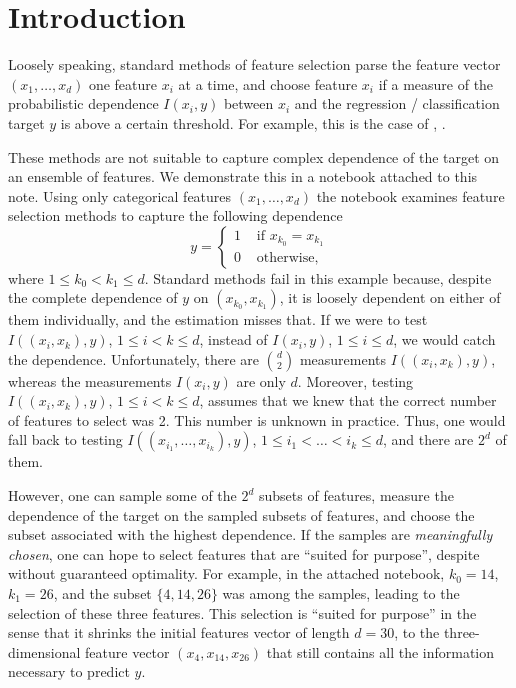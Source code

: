 \section{Introduction}

Loosely speaking,
standard methods of feature selection
parse the feature vector
$(x_1, \dots, x_d)$
one feature $x_i$ at a time,
and 
choose feature $x_i$ if
a measure of the probabilistic dependence 
$I(x_i, y)$ between $x_i$ and the regression / classification target $y$
is above a certain threshold. 
For example, 
this is the case of
,
.

These methods are not suitable to capture 
complex dependence of the target on 
an ensemble of features. 
We demonstrate this in a notebook attached to this note. 
Using only categorical features 
$(x_1, \dots, x_d)$
the notebook examines feature selection methods to capture the following dependence
$$
y = \begin{cases}
	1 & \text{ if } x_{k_0} = x_{k_1}
	\\
	0 & \text{ otherwise,}
\end{cases}
$$
where $1\leq k_0 < k_1 \leq d$.
Standard methods fail in this example because,
despite the complete dependence of $y$ on $(x_{k_0}, x_{k_1})$,
it is loosely dependent on either of them individually, 
and the estimation misses that.
If we were to test 
$I((x_{i}, x_{k}), y)$,  
$1\leq i < k \leq d$,
instead of 
$I(x_i, y)$,
$1\leq i \leq d$,
we would catch the dependence. 
Unfortunately,
there are ${d \choose 2}$ measurements $I((x_{i}, x_{k}), y)$,
whereas the measurements $I(x_i, y)$ are only $d$. 
Moreover, 
testing
$I((x_{i}, x_{k}), y)$,  
$1\leq i < k \leq d$,
assumes that we knew that the correct number of features to select was 2. 
This number is unknown in practice. 
Thus, one would fall back to testing
$I((x_{i_1}, \dots,  x_{i_{k}}), y)$,  
$1\leq i_1 <\dots < i_k \leq d$,
and there are $2^d$ of them.

However,
one can sample some of the $2^d$ subsets of features,
measure the dependence of the target on the sampled subsets of features,
and choose the subset associated with the highest dependence. 
If the samples are \emph{meaningfully chosen},
one can hope to select features that are 
``suited for purpose'',
despite without guaranteed optimality.
For example, in the attached notebook,
$k_0 = 14$,
$k_1 = 26$,
and
the subset $\lbrace4, 14, 26\rbrace$ was among the samples,
leading to the selection of these three features. 
This selection is 
``suited for purpose''
in the sense that 
it shrinks the initial features vector of length $d = 30$, 
to the three-dimensional feature vector $(x_4, x_{14}, x_{26})$ 
that still contains all the information necessary to predict $y$. 

